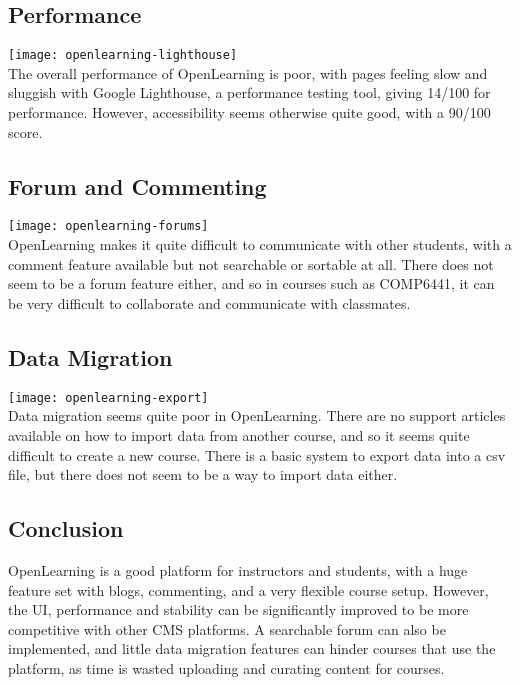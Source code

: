 \subsection{Performance}
\texttt{[image: openlearning-lighthouse]} \\
The overall performance of OpenLearning is poor, with pages feeling slow and sluggish with Google Lighthouse, a performance testing tool, giving 14/100 for performance. However, accessibility seems otherwise quite good, with a 90/100 score. \\

\subsection{Forum and Commenting}
\texttt{[image: openlearning-forums]} \\
OpenLearning makes it quite difficult to communicate with other students, with a comment feature available but not searchable or sortable at all. There does not seem to be a forum feature either, and so in courses such as COMP6441, it can be very difficult to collaborate and communicate with classmates. \\


\subsection{Data Migration}
\texttt{[image: openlearning-export]} \\
Data migration seems quite poor in OpenLearning. There are no support articles available on how to import data from another course, and so it seems quite difficult to create a new course. There is a basic system to export data into a csv file, but there does not seem to be a way to import data either.

\subsection{Conclusion}
OpenLearning is a good platform for instructors and students, with a huge feature set with blogs, commenting, and a very flexible course setup. However, the UI, performance and stability can be significantly improved to be more competitive with other CMS platforms. A searchable forum can also be implemented, and little data migration features can hinder courses that use the platform, as time is wasted uploading and curating content for courses.

